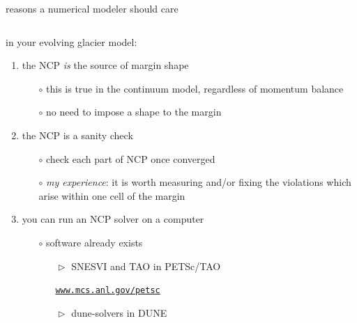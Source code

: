 \documentclass[10pt,hyperref,dvipsnames]{beamer}
\begin{document}
\begin{frame}{reasons a numerical modeler should care}

\begin{columns}
\begin{column}{0.65\textwidth}
in your evolving glacier model:
\begin{enumerate}
\item the NCP \emph{is} the source of margin shape
    \begin{itemize}
    \item[$\circ$] this is true in the continuum model, regardless of momentum balance
    \item[$\circ$] no need to impose a shape to the margin
    \end{itemize}
\item the NCP is a sanity check
    \begin{itemize}
    \item[$\circ$] check each part of NCP once converged
    \item[$\circ$] \emph{my experience}: it is worth measuring and/or fixing the violations which arise within one cell of the margin
    \end{itemize}
\item you can run an NCP solver on a computer
    \begin{itemize}
    \item[$\circ$] software already exists
        \begin{itemize}
        \item[$\vartriangleright$] SNESVI and TAO in PETSc/TAO
        
        \href{https://www.mcs.anl.gov/petsc/}{\texttt{www.mcs.anl.gov/petsc}}
        \item[$\vartriangleright$] dune-solvers in DUNE
        

\end{itemize}
\end{itemize}
\end{enumerate}
\end{column}
\end{columns}
\end{frame}
\end{document}
